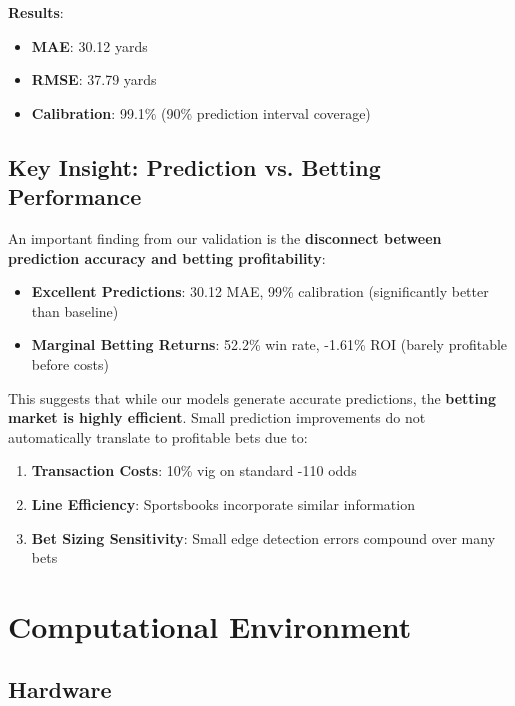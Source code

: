 \textbf{Results}:
\begin{itemize}
    \item \textbf{MAE}: 30.12 yards
    \item \textbf{RMSE}: 37.79 yards
    \item \textbf{Calibration}: 99.1\% (90\% prediction interval coverage)
\end{itemize}

\subsection{Key Insight: Prediction vs. Betting Performance}

An important finding from our validation is the \textbf{disconnect between prediction accuracy and betting profitability}:

\begin{itemize}
    \item \textbf{Excellent Predictions}: 30.12 MAE, 99\% calibration (significantly better than baseline)
    \item \textbf{Marginal Betting Returns}: 52.2\% win rate, -1.61\% ROI (barely profitable before costs)
\end{itemize}

This suggests that while our models generate accurate predictions, the \textbf{betting market is highly efficient}. Small prediction improvements do not automatically translate to profitable bets due to:
\begin{enumerate}
    \item \textbf{Transaction Costs}: 10\% vig on standard -110 odds
    \item \textbf{Line Efficiency}: Sportsbooks incorporate similar information
    \item \textbf{Bet Sizing Sensitivity}: Small edge detection errors compound over many bets
\end{enumerate}

\section{Computational Environment}

\subsection{Hardware}

